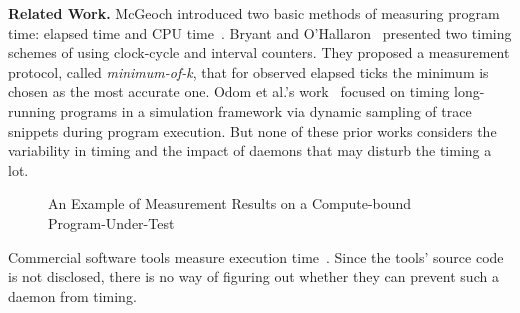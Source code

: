 \documentclass[letter]{ieice}
\begin{document}
{\bf Related Work.} 
McGeoch introduced
two basic methods of measuring program time: elapsed time and CPU time~\cite{Mcgeoch12}. 
Bryant and O'Hallaron~\cite{Randal03} 
presented two timing schemes of using clock-cycle and interval counters. 
They proposed a measurement protocol, called {\em minimum-of-k}, 
that for observed elapsed ticks the minimum is chosen as the most accurate one. 
Odom et al.'s work~\cite{Odom05} focused on timing long-running programs 
in a simulation framework via dynamic sampling of trace snippets during program execution. 
But none of these prior works considers the variability in 
timing and the impact of daemons that may disturb the timing a lot.

\begin{figure}[t]
	\centering
	\caption{{\color{blue}An Example of Measurement Results on a \linebreak \hbox{Compute-bound}} 
	Program-Under-Test~\label{fig:meas_comp}}
	\vspace{-.18in}
\end{figure} 

Commercial software tools measure execution time~\cite{VTune,TimeSys,WindView}. 
Since the tools' source code is not disclosed, there is no way of figuring out 
whether they can prevent such a daemon from timing. 
\end{document}
